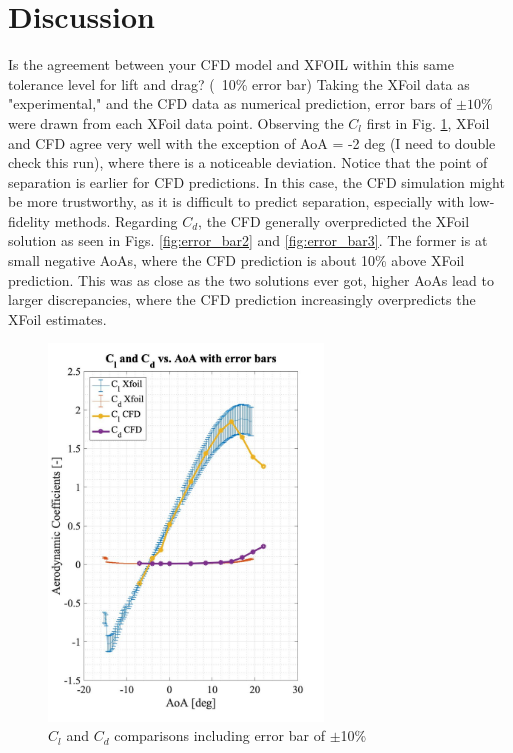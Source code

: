 \section{Discussion}

Is the agreement between your CFD model and XFOIL within this same tolerance level for lift and drag? (~10\% error bar)
Taking the XFoil data as "experimental," and the CFD data as numerical prediction, error bars of $\pm10\%$ were drawn from each XFoil data point. Observing the $C_l$ first in Fig. \ref{fig:error_bar1}, XFoil and CFD agree very well with the exception of AoA = -2 deg (I need to double check this run), where there is a noticeable deviation. Notice that the point of separation is earlier for CFD predictions. In this case, the CFD simulation might be more trustworthy, as it is difficult to predict separation, especially with low-fidelity methods. Regarding $C_d$, the CFD generally overpredicted the XFoil solution as seen in Figs. \ref{fig:error_bar2} and \ref{fig:error_bar3}. The former is at small negative AoAs, where the CFD prediction is about 10\% above XFoil prediction. This was as close as the two solutions ever got, higher AoAs lead to larger discrepancies, where the CFD prediction increasingly overpredicts the XFoil estimates.

\begin{figure}[H]
\centering
    \includegraphics[width=0.65\textwidth]{error_bar1.jpg}
    \caption{$C_l$ and $C_d$ comparisons including error bar of $\pm$10\%}
    \label{fig:error_bar1}
\end{figure}

